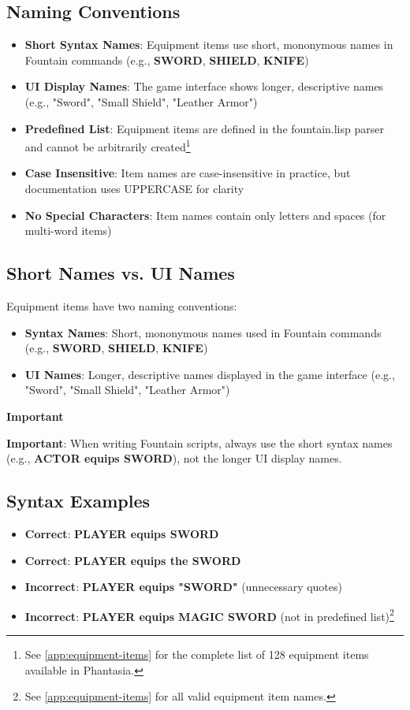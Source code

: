\documentclass[11pt,letterpaper,oldstylefigures]{memoir}
\newenvironment{Important}
{\begingroup
\small
\setlength{\parindent}{0pt}
\setlength{\parskip}{0.5em}
\allowdisplaybreaks
\setlength{\displaywidowpenalty}{0}
\setlength{\widowpenalty}{0}
\setlength{\clubpenalty}{0}
\setlength{\interlinepenalty}{0}
\begin{tcolorbox}[
    colback=yellow!5,
    colframe=yellow!75!black,
    boxrule=0.5pt,
    arc=2pt,
    left=0.5em,
    right=0.5em,
    top=0.25em,
    bottom=0.25em
]
\textbf{Important}
\end{tcolorbox}\par
}
{\endgroup}
\newcommand{\fountain}[1]{\textbf{#1}}
\newcommand{\Phantasia}{{\irishfont Phantasia}}
\begin{document}
\subsection{Naming Conventions}
\begin{itemize}
\item \textbf{Short Syntax Names}: Equipment items use short, mononymous names in Fountain commands (e.g., \fountain{SWORD}, \fountain{SHIELD}, \fountain{KNIFE})
\item \textbf{UI Display Names}: The game interface shows longer, descriptive names (e.g., "Sword", "Small Shield", "Leather Armor")
\item \textbf{Predefined List}: Equipment items are defined in the fountain.lisp parser and cannot be arbitrarily created\footnote{See \autoref{app:equipment-items} for the complete list of 128 equipment items available in \Phantasia{}.}
\item \textbf{Case Insensitive}: Item names are case-insensitive in practice, but documentation uses UPPERCASE for clarity
\item \textbf{No Special Characters}: Item names contain only letters and spaces (for multi-word items)
\end{itemize}

\subsection{Short Names vs. UI Names}

Equipment items have two naming conventions:
\begin{itemize}
\item \textbf{Syntax Names}: Short, mononymous names used in Fountain commands (e.g., \fountain{SWORD}, \fountain{SHIELD}, \fountain{KNIFE})
\item \textbf{UI Names}: Longer, descriptive names displayed in the game interface (e.g., "Sword", "Small Shield", "Leather Armor")
\end{itemize}

\begin{Important}
\textbf{Important}: When writing Fountain scripts, always use the short syntax names (e.g., \fountain{ACTOR equips SWORD}), not the longer UI display names.
\end{Important}

\subsection{Syntax Examples}
\begin{itemize}
\item \textbf{Correct}: \fountain{PLAYER equips SWORD}
\item \textbf{Correct}: \fountain{PLAYER equips the SWORD}
\item \textbf{Incorrect}: \fountain{PLAYER equips "SWORD"} (unnecessary quotes)
\item \textbf{Incorrect}: \fountain{PLAYER equips MAGIC SWORD} (not in predefined list)\footnote{See \autoref{app:equipment-items} for all valid equipment item names.}
\end{itemize}
\end{document}
